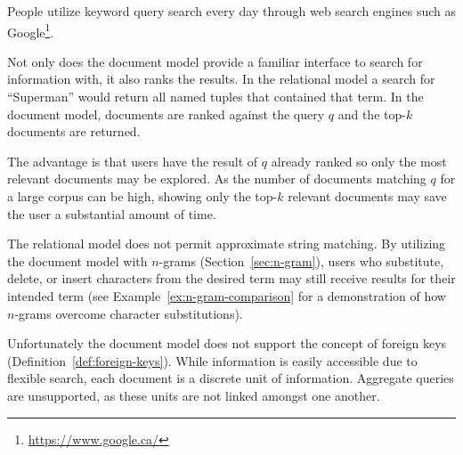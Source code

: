 		People utilize keyword query search every day through web search engines such as Google\footnote{\url{https://www.google.ca/}}.
		
		Not only does the document model provide a familiar interface to search for information with, it also ranks the results.  In the relational model a search for ``Superman'' would return all named tuples that contained that term.  In the document model, documents are ranked against the query $q$ and the top-$k$ documents are returned.
		
		The advantage is that users have the result of $q$ already ranked so only the most relevant documents may be explored.  As the number of documents matching $q$ for a large corpus can be high, showing only the top-$k$ relevant documents may save the user a substantial amount of time.
		
		The relational model does not permit approximate string matching.  By utilizing the document model with $n$-grams (Section~\ref{sec:n-gram}), users who substitute, delete, or insert characters from the desired term may still receive results for their intended term (see Example~\ref{ex:n-gram-comparison} for a demonstration of how $n$-grams overcome character substitutions).
		
		Unfortunately the document model does not support the concept of foreign keys (Definition~\ref{def:foreign-keys}).  While information is easily accessible due to flexible search, each document is a discrete unit of information.  Aggregate queries are unsupported, as these units are not linked amongst one another.